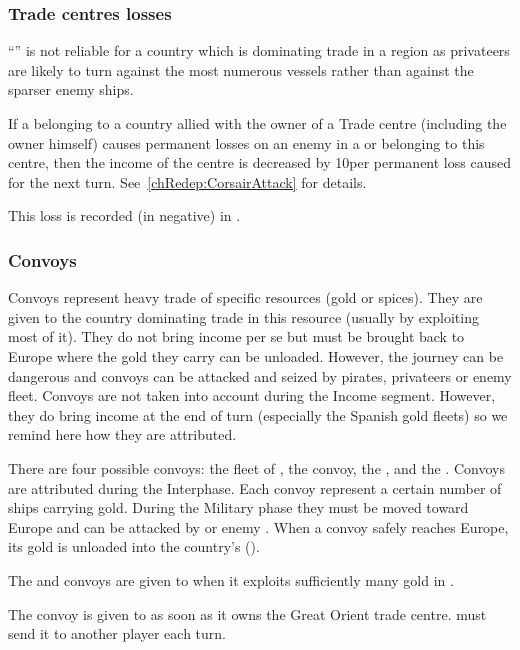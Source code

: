 \subsubsection{Trade centres losses}
\aparag ``'' is not reliable for a country which
is dominating trade in a region as privateers are likely to turn against
the most numerous vessels rather than against the sparser enemy ships.

\aparag If a \corsaire belonging to a country allied with the owner of
a Trade centre (including the owner himself) causes permanent losses on
an enemy \TradeFLEET in a \STZ or \CTZ belonging to this centre, then
the income of the centre is decreased by 10\ducats per permanent loss
caused for the next turn.
\bparag See~\ref{chRedep:CorsairAttack} for details.

\aparag This loss is recorded (in negative) in .

\subsubsection{Convoys}
\aparag Convoys represent heavy trade of specific resources (gold or
spices). They are given to the country dominating trade in this resource
(usually by exploiting most of it). They do not bring income per se but
must be brought back to Europe where the gold they carry can be
unloaded. However, the journey can be dangerous and convoys can be
attacked and seized by pirates, privateers or enemy fleet.
\bparag Convoys are not taken into account during the Income
segment. However, they do bring income at the end of turn (especially
the Spanish gold fleets) so we remind here how they are
attributed.

\aparag There are four possible convoys: the  fleet of
, the  convoy, the ,
and the .
\bparag Convoys are attributed during the Interphase.
\bparag Each convoy represent a certain number of ships carrying
gold. During the Military phase they must be moved toward Europe and can
be attacked by \corsaire or enemy \FLEET.
\bparag When a convoy safely reaches Europe, its gold is unloaded into
the country's \RT ().

\aparag The  and  convoys are
given to \SPA when it exploits sufficiently many gold in
.

\aparag The  convoy is given to \TUR as soon as it owns
the Great Orient trade centre. \TUR must send it to another player each
turn.

